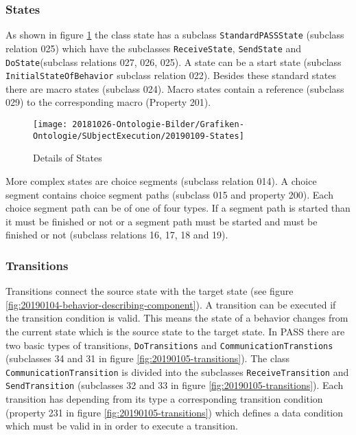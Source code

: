 \subsubsection{States}

As shown in figure \ref{fig:20190109-states} the class state has a subclass \texttt{StandardPASSState} (subclass relation 025) which have the subclasses \texttt{ReceiveState}, \texttt{SendState} and \texttt{DoState}(subclass relations 027, 026, 025). A state can be a start state (subclass \texttt{InitialStateOfBehavior} subclass relation 022). Besides these standard states there are macro states (subclass 024). Macro states contain a reference (subclass 029) to the corresponding macro (Property 201).

\begin{figure}[htbp]
	\centering
	\texttt{[image: 20181026-Ontologie-Bilder/Grafiken-Ontologie/SUbjectExecution/20190109-States]}
	\caption[Details of States]{Details of States}
	\label{fig:20190109-states}
\end{figure}

More complex states are choice segments (subclass relation 014). A choice segment contains choice segment paths (subclass 015 and property 200). Each choice segment path can be of one of four types. If a segment path is started than it must be finished or not or a segment path must be started and must be finished or not (subclass relations 16, 17, 18 and 19).

\subsubsection{Transitions}

Transitions connect the source state with the target state (see figure \ref{fig:20190104-behavior-describing-component}). A transition can be executed if the transition condition is valid. This means the state of a behavior changes from the current state which is the source state to the target state. In PASS there are two basic types of transitions, \texttt{DoTransitions} and \texttt{CommunicationTranstions} (subclasses 34 and 31 in figure \ref{fig:20190105-transitions}). The class \texttt{CommunicationTransition} is divided into the subclasses \texttt{ReceiveTransition} and \texttt{SendTransition} (subclasses 32 and 33 in figure \ref{fig:20190105-transitions}). Each transition has depending from its type a corresponding transition condition (property 231 in figure  \ref{fig:20190105-transitions}) which defines a data condition which must be valid in in order to execute a transition.

